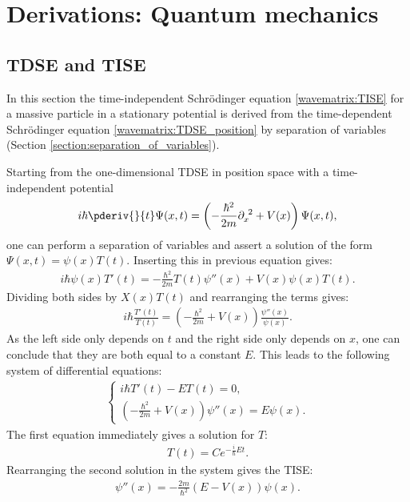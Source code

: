 \chapter{Derivations: Quantum mechanics}\label{chapter:derivations_qm}

\section{TDSE and TISE}\label{section:tdse_tise}

    In this section the time-independent Schr\"odinger equation \ref{wavematrix:TISE} for a massive particle in a stationary potential is derived from the time-dependent Schr\"odinger equation \eqref{wavematrix:TDSE_position} by separation of variables (Section \ref{section:separation_of_variables}).

   	Starting from the one-dimensional TDSE in position space with a time-independent potential
    \begin{gather}
		i\hbar\pderiv{}{t}\Psi(x,t) = \left(-\frac{\hbar^2}{2m}\partial_x^{\ 2} + V(x)\right)\Psi(x,t),
	\end{gather}
    one can perform a separation of variables and assert a solution of the form $\Psi(x,t) = \psi(x)T(t)$. Inserting this in previous equation gives:
    \begin{gather}
		i\hbar\psi(x)T'(t) = -\frac{\hbar^2}{2m}T(t)\psi''(x) + V(x)\psi(x)T(t).
	\end{gather}
    Dividing both sides by $X(x)T(t)$ and rearranging the terms gives:
    \begin{gather}
		i\hbar\frac{T'(t)}{T(t)} = \left(-\frac{\hbar^2}{2m} + V(x)\right)\frac{\psi''(x)}{\psi(x)}.
	\end{gather}
    As the left side only depends on $t$ and the right side only depends on $x$, one can conclude that they are both equal to a constant $E$. This leads to the following system of differential equations:
    \begin{gather}
        \begin{cases}
            i\hbar T'(t) - ET(t) = 0,\\
            \left(-\frac{\hbar^2}{2m} + V(x)\right)\psi''(x) = E\psi(x).
        \end{cases}
    \end{gather}
    The first equation immediately gives a solution for $T$:
    \begin{gather}
       	\label{derivations_qm:exponential}
		T(t) = Ce^{-\frac{i}{\hbar}Et}.
	\end{gather}
    Rearranging the second solution in the system gives the TISE:
    \begin{gather}
       	\label{derivations_qm:TISE}
		\psi''(x) = -\frac{2m}{\hbar^2}\left(E - V(x)\right)\psi(x).
	\end{gather}